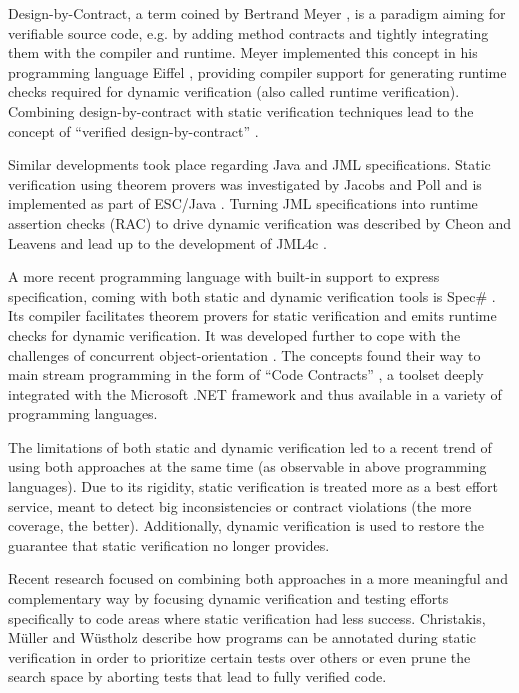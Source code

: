 Design-by-Contract, a term coined by Bertrand Meyer \cite{meyer2002design}, is a paradigm aiming for verifiable source code, e.g. by adding method contracts and tightly integrating them with the compiler and runtime.
Meyer implemented this concept in his programming language Eiffel \cite{meyer1988eiffel}, providing compiler support for generating runtime checks required for dynamic verification (also called runtime verification).
Combining design-by-contract with static verification techniques lead to the concept of “verified design-by-contract” \cite{crocker2004safe}.

Similar developments took place regarding Java and JML specifications.
Static verification using theorem provers was investigated by Jacobs and Poll \cite{jacobs2001logic} and is implemented as part of ESC/Java \cite{nelson2004extended}.
Turning JML specifications into runtime assertion checks (RAC) to drive dynamic verification was described by Cheon and Leavens \cite{cheon2002runtime} and lead up to the development of JML4c \cite{sarcar2010new}.

A more recent programming language with built-in support to express specification, coming with both static and dynamic verification tools is Spec\# \cite{the-spec-programming-system-an-overview}.
Its compiler facilitates theorem provers for static verification and emits runtime checks for dynamic verification.
It was developed further to cope with the challenges of concurrent object-orientation \cite{a-statically-verifiable-programming-model-for-concurrent-object-oriented-programs}.
The concepts found their way to main stream programming in the form of “Code Contracts” \cite{embedded-contract-languages}, a toolset deeply integrated with the Microsoft .NET framework and thus available in a variety of programming languages.

The limitations of both static and dynamic verification led to a recent trend of using both approaches at the same time (as observable in above programming languages).
Due to its rigidity, static verification is treated more as a best effort service, meant to detect big inconsistencies or contract violations (the more coverage, the better).
Additionally, dynamic verification is used to restore the guarantee that static verification no longer provides.

Recent research focused on combining both approaches in a more meaningful and complementary way by focusing dynamic verification and testing efforts specifically to code areas where static verification had less success.
Christakis, Müller and Wüstholz \cite{ChristakisMuellerWuestholz16} describe how programs can be annotated during static verification in order to prioritize certain tests over others or even prune the search space by aborting tests that lead to fully verified code.

